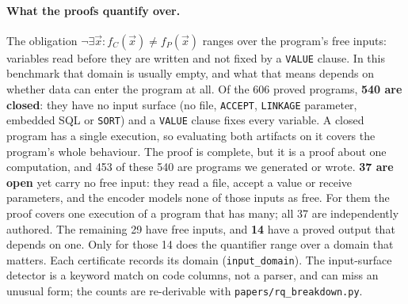 \documentclass[sigconf,nonacm]{acmart}
\begin{document}
\paragraph{What the proofs quantify over.} The obligation $\neg\exists \vec{x}: f_C(\vec{x}) \neq f_P(\vec{x})$ ranges over the program's free inputs: variables read before they are written and not fixed by a \texttt{VALUE} clause. In this benchmark that domain is usually empty, and what that means depends on whether data can enter the program at all. Of the 606 proved programs, \textbf{540 are closed}: they have no input surface (no file, \texttt{ACCEPT}, \texttt{LINKAGE} parameter, embedded SQL or \texttt{SORT}) and a \texttt{VALUE} clause fixes every variable. A closed program has a single execution, so evaluating both artifacts on it covers the program's whole behaviour. The proof is complete, but it is a proof about one computation, and 453 of these 540 are programs we generated or wrote. \textbf{37 are open} yet carry no free input: they read a file, accept a value or receive parameters, and the encoder models none of those inputs as free. For them the proof covers one execution of a program that has many; all 37 are independently authored. The remaining 29 have free inputs, and \textbf{14} have a proved output that depends on one. Only for those 14 does the quantifier range over a domain that matters. Each certificate records its domain (\texttt{input\_domain}). The input-surface detector is a keyword match on code columns, not a parser, and can miss an unusual form; the counts are re-derivable with \texttt{papers/rq\_breakdown.py}.
\end{document}
